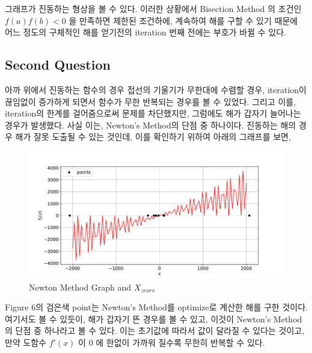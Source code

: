 \documentclass[11pt]{article}
\begin{document}
그래프가 진동하는 형상을 볼 수 있다. 이러한 상황에서 Bisection Method 의 조건인 $f(a)f(b) < 0 $ 을 만족하면 제한된 조건하에, 계속하여 해를 구할 수 있기 때문에 어느 정도의 구체적인 해를 얻기전의 iteration 번째 전에는 부호가 바뀔 수 있다.













\subsection{Second Question} 
아까 위에서 진동하는 함수의 경우 접선의 기울기가 무한대에 수렴할 경우, iteration이 끊임없이 증가하게 되면서 함수가 무한 반복되는 경우를 볼 수 있었다. 그리고 이를, iteration의 한계를 걸어줌으로써 문제를 차단했지만, 그럼에도 해가 갑자기 늘어나는 경우가 발생했다. 사실 이는, Newton's Method의 단점 중 하나이다. 진동하는 해의 경우 해가 잘못 도출될 수 있는 것인데, 이를 확인하기 위하여 아래의 그래프를 보면,
\begin{figure}[!ht]
  \centering
  \includegraphics[width=1\textwidth]{Newtown_Method_strange.pdf}
  \caption{Newton Method Graph and  $X_{zeors}$}
\end{figure}

\vspace{5mm}

\vspace{5mm}


\noindent  
Figure 6의 검은색 point는 Newton's Method를 optimize로 계산한 해를 구한 것이다. 여기서도 볼 수 있듯이,  해가 갑자기 뜬 경우를 볼 수 있고, 이것이 Newton's Method의 단점 중 하나라고 볼 수 있다. 이는 초기값에 따라서 값이 달라질 수 있다는 것이고, 만약 도함수 $f'(x)$ 이 0 에 한없이 가까워 질수록 무한히 반복할 수 있다.
\clearpage
\end{document}
